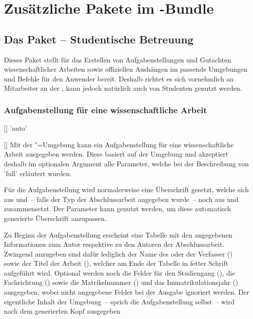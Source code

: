 \chapter{Zusätzliche Pakete im \TUDScript-Bundle}
\section{Das Paket  -- Studentische Betreuung}
\begin{Declaration*}{}
Dieses Paket stellt für das Erstellen von Aufgabenstellungen und Gutachten  
wissenschaftlicher Arbeiten sowie offiziellen Aushängen im \CD passende 
Umgebungen und Befehle für den Anwender bereit. Deshalb richtet es sich 
vornehmlich an Mitarbeiter an der \TnUD, kann jedoch natürlich auch von 
Studenten genutzt werden.


\subsection{Aufgabenstellung für eine wissenschaftliche Arbeit}
\begin{Declaration}{[]}{%
  'auto'%
}
\begin{Declaration}{[]}
\printdeclarationlist%
%
%
Mit der "=Umgebung kann ein Aufgabenstellung für eine 
wissenschaftliche Arbeit ausgegeben werden. Diese basiert auf der Umgebung 
 und akzeptiert deshalb im optionalen Argument alle 
Parameter, welche bei der Beschreibung von 'full' 
erläutert wurden.

Für die Aufgabenstellung wird normalerweise eine Überschrift gesetzt, welche 
sich aus  und~-- falls der Typ der Abschlussarbeit angegeben 
wurde~-- noch aus  und  zusammensetzt. Der 
Parameter  kann genutzt werden, um diese 
automatisch generierte Überschrift anzupassen.

Zu Beginn der Aufgabenstellung erscheint eine Tabelle mit den angegebenen 
Informationen zum Autor respektive zu den Autoren der Abschlussarbeit. Zwingend 
anzugeben sind dafür lediglich der Name des oder der Verfasser () 
sowie der Titel der Arbeit (), welcher am Ende der Tabelle in 
fetter Schrift aufgeführt wird. Optional werden noch die Felder für den 
Studiengang (), die Fachrichtung () sowie die 
Matrikelnummer () und das Immatrikulationsjahr 
() ausgegeben, wobei nicht angegebene Felder bei der 
Ausgabe ignoriert werden. Der eigentliche Inhalt der Umgebung~-- sprich die 
Aufgabenstellung selbst~-- wird nach dem generierten Kopf ausgegeben


\end{Declaration}
\end{Declaration}
\end{Declaration*}
